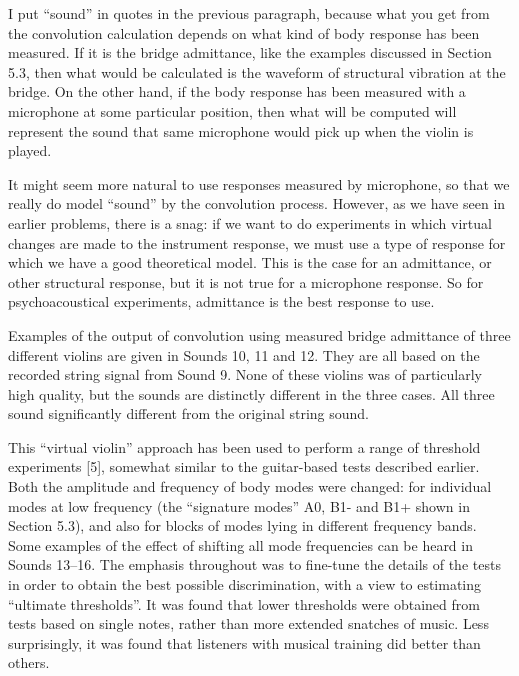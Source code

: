 
  I put ``sound'' in quotes in the previous paragraph, because what you get 
  from the convolution calculation depends on what kind of body response has 
  been measured. If it is the bridge admittance, like the examples discussed in 
  Section 5.3, then what would be calculated is the waveform of structural 
  vibration at the bridge. On the other hand, if the body response has been 
  measured with a microphone at some particular position, then what will be 
  computed will represent the sound that same microphone would pick up when the 
  violin is played. 

  It might seem more natural to use responses measured by microphone, so that 
  we really do model ``sound'' by the convolution process. However, as we have 
  seen in earlier problems, there is a snag: if we want to do experiments in 
  which virtual changes are made to the instrument response, we must use a type 
  of response for which we have a good theoretical model. This is the case for 
  an admittance, or other structural response, but it is not true for a 
  microphone response. So for psychoacoustical experiments, admittance is the 
  best response to use. 

  Examples of the output of convolution using measured bridge admittance of 
  three different violins are given in Sounds 10, 11 and 12. They are all based 
  on the recorded string signal from Sound 9. None of these violins was of 
  particularly high quality, but the sounds are distinctly different in the 
  three cases. All three sound significantly different from the original string 
  sound. 




  This “virtual violin” approach has been used to perform a range of threshold 
  experiments [5], somewhat similar to the guitar-based tests described 
  earlier. Both the amplitude and frequency of body modes were changed: for 
  individual modes at low frequency (the “signature modes” A0, B1- and B1+ 
  shown in Section 5.3), and also for blocks of modes lying in different 
  frequency bands. Some examples of the effect of shifting all mode frequencies 
  can be heard in Sounds 13--16. The emphasis throughout was to fine-tune the 
  details of the tests in order to obtain the best possible discrimination, 
  with a view to estimating “ultimate thresholds”. It was found that lower 
  thresholds were obtained from tests based on single notes, rather than more 
  extended snatches of music. Less surprisingly, it was found that listeners 
  with musical training did better than others. 

